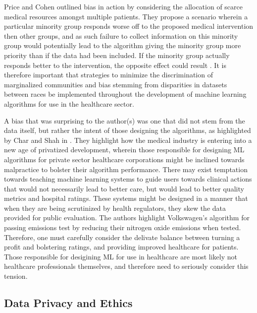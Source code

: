 \documentclass[12pt]{article}
\begin{document}
Price and Cohen outlined bias in action by considering the allocation of scarce medical resources amongst multiple patients. They propose a scenario wherein a particular minority group responds worse off to the proposed medical intervention then other groups, and as such failure to collect information on this minority group would potentially lead to the algorithm giving the minority group more priority than if the data had been included. If the minority group actually responds better to the intervention, the opposite effect could result \cite{Price_2019}.
It is therefore important that strategies to minimize the discrimination of marginalized communities and bias stemming from disparities in datasets between races be implemented throughout the development of machine learning algorithms for use in the healthcare sector.


A bias that was surprising to the author(s) was one that did not stem from the data itself, but rather the intent of those designing the algorithms, as highlighted by Char and Shah in \cite{Char_2018}. They highlight how the medical industry is entering into a new age of privatized development, wherein those responsible for designing ML algorithms for private sector healthcare corporations might be inclined towards malpractice to bolster their algorithm performance. There may exist temptation towards teaching machine learning systems to guide users towards clinical actions that would not necessarily lead to better care, but would lead to better quality metrics and hospital ratings. These systems might be designed in a manner that when they are being scrutinized by health regulators, they skew the data provided for public evaluation. The authors highlight Volkswagen's algorithm for passing emissions test by reducing their nitrogen oxide emissions when tested. Therefore, one must carefully consider the delivate balance between turning a profit and bolstering ratings, and providing improved healthcare for patients. Those responsible for desigining ML for use in healthcare are most likely not healthcare professionals themselves, and therefore need to seriously consider this tension.\

\vspace{-5mm}
\subsection{Data Privacy and Ethics}
\end{document}
